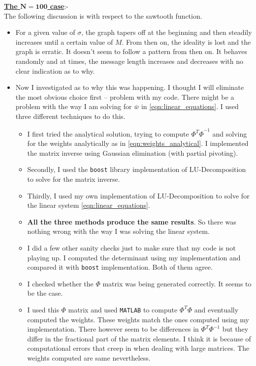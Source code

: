 \documentclass[a4paper,12pt]{article}
\begin{document}
\noindent\textbf{\underline{The $\mathbf{N=100}$ case}}:- \\
The following discussion is with respect to the sawtooth function. 
\begin{itemize}
 \item For a given value of $\sigma$, the graph tapers off at the beginning and then steadily increases until a certain value of $M$. From then on, the ideality is lost and the graph is erratic. It doesn't seem to follow a pattern from then on. It behaves randomly and at times, the message length increases and decreases with no clear indication as to why.
 
 \item Now I investigated as to why this was happening. I thought I will eliminate the most obvious choice first -- problem with my code. There might be a problem with the way I am solving for $\bar{w}$ in \eqref{eqn:linear_equations}. I used three different techniques to do this. 
	\begin{itemize}
	    \item I first tried the analytical solution, trying to compute ${\Phi^T \Phi}^{-1}$ and solving for the weights analytically as in \eqref{eqn:weights_analytical}. I implemented the matrix inverse using Gaussian elimination (with partial pivoting).
	    \item Secondly, I used the \texttt{boost} library implementation of LU-Decomposition to solve for the matrix inverse.
	    \item Thirdly, I used my own implementation of LU-Decomposition to solve for the linear system \eqref{eqn:linear_equations}.
	    \item \textbf{All the three methods produce the same results}. So there was nothing wrong with the way I was solving the linear system.
	    \item I did a few other sanity checks just to make sure that my code is not playing up. I computed the determinant using my implementation and compared it with \texttt{boost} implementation. Both of them agree.
	    \item I checked whether the $\Phi$ matrix was being generated correctly. It seems to be the case.
	    \item I used this $\Phi$ matrix and used \texttt{MATLAB} to compute $\Phi^T\Phi$ and eventually computed the weights. These weights match the ones computed using my implementation. There however seem to be differences in $\Phi^T\Phi^{-1}$ but they differ in the fractional part of the matrix elements. I think it is because of computational errors that creep in when dealing with large matrices. The weights computed are same nevertheless.
	\end{itemize}    
	

\end{itemize}
\end{document}
